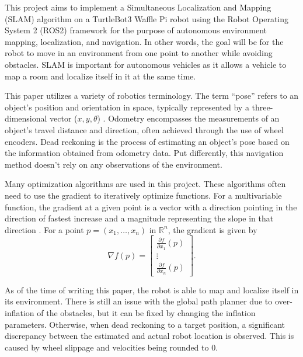 This project aims to implement a Simultaneous Localization and Mapping (SLAM) algorithm on a TurtleBot3 Waffle Pi robot using the Robot Operating System 2 (ROS2) framework for the purpose of autonomous environment mapping, localization, and navigation. In other words, the goal will be for the robot to move in an environment from one point to another while avoiding obstacles. SLAM is important for autonomous vehicles as it allows a vehicle to map a room and localize itself in it at the same time.

This paper utilizes a variety of robotics terminology. The term ``pose'' refers to an object's position and orientation in space, typically represented by a three-dimensional vector ($x,y,\theta$) \parencite{corkeRoboticsVisionControl2023}. Odometry encompasses the measurements of an object's travel distance and direction, often achieved through the use of wheel encoders. Dead reckoning is the process of estimating an object's pose based on the information obtained from odometry data. Put differently, this navigation method doesn't rely on any observations of the environment.

Many optimization algorithms are used in this project. These algorithms often need to use the gradient to iteratively optimize functions. For a multivariable function, the gradient at a given point is a vector with a direction pointing in the direction of fastest increase and a magnitude representing the slope in that direction \parencite{Gradient2024}. For a point $p = (x_1,\hdots, x_n)$ in $\mathbb{R}^n$, the gradient is given by
\[
    \nabla f(p)=\begin{bmatrix}
        \frac{\partial f}{\partial x_1}(p) \\[6pt]
        \vdots                             \\[6pt]
        \frac{\partial f}{\partial x_n}(p)
    \end{bmatrix}.
\]

As of the time of writing this paper, the robot is able to map and localize itself in its environment. There is still an issue with the global path planner due to over-inflation of the obstacles, but it can be fixed by changing the inflation parameters. Otherwise, when dead reckoning to a target position, a significant discrepancy between the estimated and actual robot location is observed. This is caused by wheel slippage and velocities being rounded to 0.